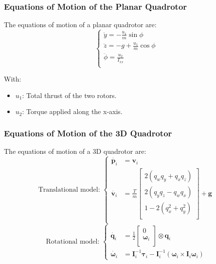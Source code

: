 \documentclass{thesisbeamer}
\newcommand\Fontvi{\fontsize{9}{10}\selectfont}
\begin{document}
\begin{frame}
	\frametitle{Equations of Motion of the Planar Quadrotor}
	\Fontvi
	
	The equations of motion of a planar quadrotor are:
	\begin{equation}\label{dynamics_planar_quadrotor}
 \begin{cases} 
       \ddot{y} = - \frac{u_1}{m} \sin{\phi} \\
       \ddot{z} = - g + \frac{u_1}{m} \cos{\phi} \\
       \ddot{\phi} = \frac{u_2}{I_{xx}} \\
   \end{cases}
\end{equation}

With: 

\begin{itemize}
	\item $u_1$: Total thrust of the two rotors.
	\item $u_2$: Torque applied along the x-axis.
\end{itemize}

\end{frame}



\begin{frame}
	\frametitle{Equations of Motion of the 3D Quadrotor}
	\Fontvi
	
	The equations of motion of a 3D quadrotor are:
	$$
	\text{Translational model: }\left\{
	\begin{array}{ll}				
		\dot{\bm{p}_i} &= \bm{v}_i \\
		\dot{\bm{v}_i} &= 
		\frac{T}{m} 
		\begin{bmatrix}
		2 (q_w q_y + q_x q_z) \\
		2 (q_y q_z - q_w q_x) \\
		1 - 2(q_x^2 + q_y^2 ) \\
		\end{bmatrix} + \bm{g} \\	
	\end{array}
	\right.
	$$
	$$
	\text{Rotational model: }\left\{
	\begin{array}{ll}		
		\dot{\bm{q}_i} & = \frac{1}{2}
		\begin{bmatrix}
		0 \\
		\bm{\omega}_i \\
		\end{bmatrix} \otimes \bm{q}_i \\
		\dot{\bm{\omega}_i} &= \bm{I}_i^{-1} \bm{\tau}_i - \bm{I}_i^{-1} (\bm{\omega}_i \times \bm{I}_i \bm{\omega}_i)
		\end{array}
		\right.
	$$
		\end{frame}
\end{document}
